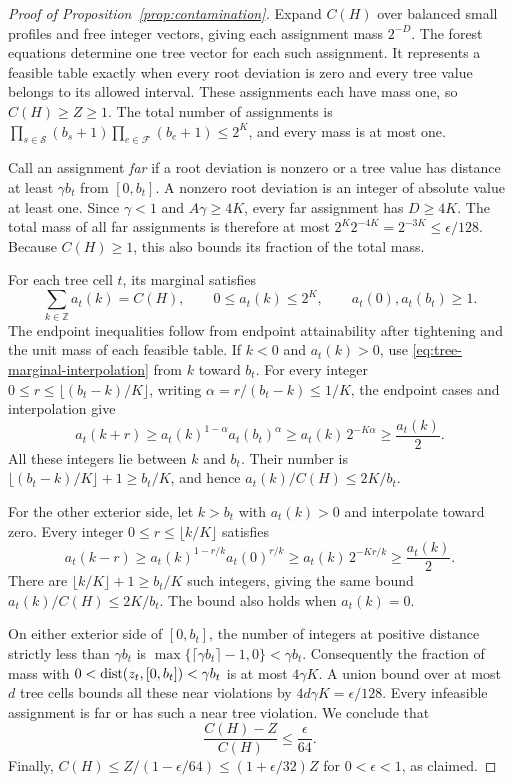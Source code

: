 \begin{proof}[Proof of Proposition~\ref{prop:contamination}]
Expand $C(H)$ over balanced small profiles and free integer vectors,
giving each assignment mass $2^{-D}$.  The forest equations determine
one tree vector for each such assignment.  It represents a feasible
table exactly when every root deviation is zero and every tree value
belongs to its allowed interval.  These assignments each have mass
one, so $C(H)\ge Z\ge1$.  The total number of assignments is
$\prod_{s\in\mathcal S}(b_s+1)\prod_{e\in\mathcal F}(b_e+1)\le2^K$,
and every mass is at most one.

Call an assignment \emph{far} if a root deviation is nonzero or a tree
value has distance at least $\gamma b_t$ from $[0,b_t]$.  A nonzero
root deviation is an integer of absolute value at least one.
Since $\gamma<1$ and $A\gamma\ge4K$, every far assignment has
$D\ge4K$.  The total mass of all far assignments is therefore at most
$2^K2^{-4K}=2^{-3K}\le\epsilon/128$.  Because $C(H)\ge1$, this also
bounds its fraction of the total mass.

For each tree cell $t$, its marginal satisfies
\[
\sum_{k\in\mathbb Z}a_t(k)=C(H),\qquad
0\le a_t(k)\le2^K,\qquad a_t(0),a_t(b_t)\ge1.
\]
The endpoint inequalities follow from endpoint attainability after
tightening and the unit mass of each feasible table.
If $k<0$ and $a_t(k)>0$, use
\eqref{eq:tree-marginal-interpolation} from $k$ toward $b_t$.
For every integer
$0\le r\le\lfloor(b_t-k)/K\rfloor$, writing
$\alpha=r/(b_t-k)\le1/K$, the endpoint cases and interpolation give
\[
a_t(k+r)\ge a_t(k)^{1-\alpha}a_t(b_t)^\alpha
\ge a_t(k)\,2^{-K\alpha}\ge\frac{a_t(k)}2.
\]
All these integers lie between $k$ and $b_t$.  Their number is
$\lfloor(b_t-k)/K\rfloor+1\ge b_t/K$, and hence
$a_t(k)/C(H)\le2K/b_t$.

For the other exterior side, let $k>b_t$ with $a_t(k)>0$ and
interpolate toward zero.  Every integer
$0\le r\le\lfloor k/K\rfloor$ satisfies
\[
a_t(k-r)\ge a_t(k)^{1-r/k}a_t(0)^{r/k}
\ge a_t(k)\,2^{-Kr/k}\ge\frac{a_t(k)}2.
\]
There are $\lfloor k/K\rfloor+1\ge b_t/K$ such integers, giving
the same bound $a_t(k)/C(H)\le2K/b_t$.  The bound also holds when
$a_t(k)=0$.

On either exterior side of $[0,b_t]$, the number of integers at
positive distance strictly less than $\gamma b_t$ is
$\max\{\lceil\gamma b_t\rceil-1,0\}<\gamma b_t$.
Consequently the fraction of mass with
$0<\operatorname{dist}(z_t,[0,b_t])<\gamma b_t$ is at most $4\gamma K$.
A union bound over at most $d$ tree cells bounds all these near
violations by
$4d\gamma K=\epsilon/128$.  Every infeasible assignment is far or
has such a near tree violation.  We conclude that
\[
\frac{C(H)-Z}{C(H)}\le\frac{\epsilon}{64}.
\]
Finally,
$C(H)\le Z/(1-\epsilon/64)\le(1+\epsilon/32)Z$ for
$0<\epsilon<1$, as claimed.
\end{proof}
